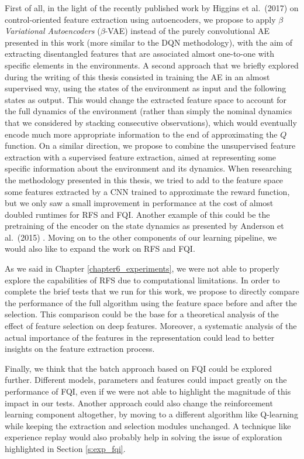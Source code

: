 First of all, in the light of the recently published work by Higgins et 
al.\ (2017) \cite{higgins2017darla} on control-oriented feature extraction using 
autoencoders, we propose to apply \textit{$\beta$ Variational Autoencoders} 
($\beta$-VAE) \cite{kingma2014auto, higgins2017beta} instead of the purely 
convolutional AE presented in this work (more similar to the DQN methodology), 
with the aim of extracting disentangled features that are associated almost 
one-to-one with specific elements in the environments.
A second approach that we briefly explored during the writing of this thesis 
consisted in training the AE in an almost supervised way, using the states of 
the environment as input and the following states as output. 
This would change the extracted feature space to account for the full dynamics 
of the environment (rather than simply the nominal dynamics that we considered 
by stacking consecutive observations), which would eventually 
encode much more appropriate information to the end of approximating the $Q$ 
function. 
On a similar direction, we propose to combine the unsupervised feature 
extraction with a supervised feature extraction, aimed at representing some 
specific information about the environment and its dynamics. 
When researching the methodology presented in this thesis, we tried to add to the 
feature space some features extracted by a CNN trained to approximate the reward 
function, but we only saw a small improvement in performance at the cost of 
almost doubled runtimes for RFS and FQI. 
Another example of this could be the pretraining of the encoder on the state 
dynamics as presented by Anderson et al.\ (2015) \cite{anderson2015faster}.
Moving on to the other components of our learning pipeline, we would also like 
to expand the work on RFS and FQI. 

As we said in Chapter \ref{chapter6_experiments}, we were not able to properly 
explore the capabilities of RFS due to computational limitations.
In order to complete the brief tests that we run for this work, we propose to
directly compare the performance of the full algorithm using the feature space
before and after the selection. 
This comparison could be the base for a theoretical analysis of the
effect of feature selection on deep features. Moreover, a systematic analysis
of the actual importance of the features in the representation could lead
to better insights on the feature extraction process. 

Finally, we think that the batch approach based on FQI could be explored further. 
Different models, parameters and features could impact greatly 
on the performance of FQI, even if we were not able to highlight the 
magnitude of this impact in our tests. 
Another approach could also change the reinforcement learning component 
altogether, by moving to a different algorithm like Q-learning while keeping
the extraction and selection modules unchanged. A technique like experience 
replay would also probably help in solving the issue of exploration highlighted 
in Section \ref{s:exp_fqi}.

